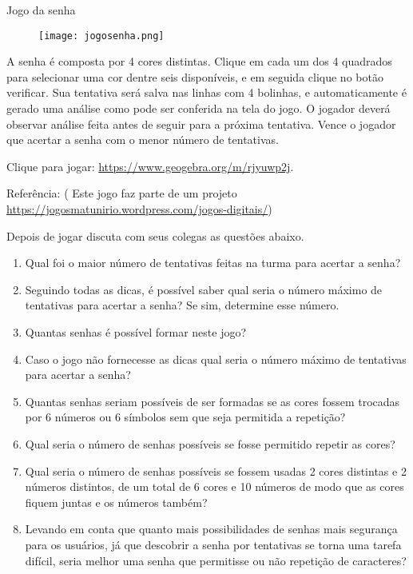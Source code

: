 \begin{task}{Jogo da senha}

\begin{figure}[H]
\centering

\texttt{[image: jogosenha.png]}
\end{figure}

A senha é composta por 4 cores distintas. Clique em cada um dos 4 quadrados para selecionar uma cor dentre seis disponíveis, e em seguida clique no botão verificar. Sua tentativa será salva nas linhas com 4 bolinhas, e automaticamente é gerado uma análise como pode ser conferida na tela do jogo. O jogador deverá observar análise feita antes de seguir para a próxima tentativa. Vence o jogador que acertar a senha com o menor número de tentativas.



Clique para jogar: \url{https://www.geogebra.org/m/rjyuwp2j}.



Referência: ( Este jogo faz parte de um projeto
\url{https://jogosmatunirio.wordpress.com/jogos-digitais/}) 



Depois de jogar discuta com seus colegas as questões abaixo. 

\begin{enumerate}

\item Qual foi o maior número de tentativas feitas na turma para acertar a senha? 
\item Seguindo todas as dicas, é possível saber qual seria o número máximo de tentativas para acertar a senha? Se sim, determine esse número.
\item Quantas senhas é possível formar neste jogo?
\item Caso o jogo não fornecesse as dicas qual seria o número máximo de tentativas para acertar a senha?
\item Quantas senhas seriam possíveis de ser formadas se as cores fossem trocadas por 6 números ou 6 símbolos sem que seja permitida a repetição?
\item Qual seria o número de senhas possíveis se fosse permitido repetir as cores?
\item Qual seria o número de senhas possíveis se fossem usadas 2 cores distintas e 2 números distintos, de um total de 6 cores e 10 números de modo que as cores fiquem juntas e os números também?
\item Levando em conta que quanto mais possibilidades de senhas mais segurança para os usuários, já que descobrir a senha por tentativas se torna uma tarefa difícil, seria melhor uma senha que permitisse ou não repetição de caracteres?


\end{enumerate}
\end{task}
